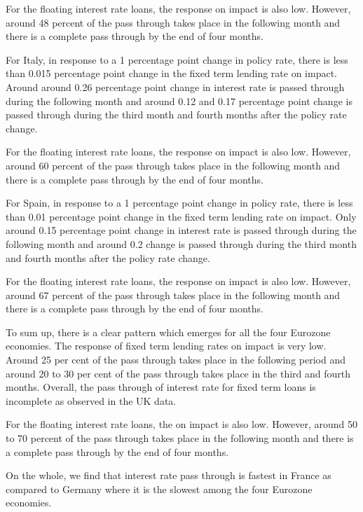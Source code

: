 \documentclass[12pt]{article}
\numberwithin{equation}{section}
\begin{document}
\begin{appendix}
For the floating interest rate loans, the response on impact is also low. However, around 48 percent of the pass through takes place in the following month and there is a complete pass through by the end of four months.


For Italy, in response to a 1 percentage point change in policy rate, there is less than 0.015 percentage point change in the fixed term lending rate on impact. Around around 0.26 percentage point change in interest rate is passed through during the following month and around 0.12 and 0.17 percentage point change is passed through during the third month and fourth months after the policy rate change.

For the floating interest rate loans, the response on impact is also low. However, around 60 percent of the pass through takes place in the following month and there is a complete pass through by the end of four months.


For Spain, in response to a 1 percentage point change in policy rate, there is less than 0.01 percentage point change in the fixed term lending rate on impact.  Only around 0.15 percentage point change in interest rate is passed through during the following month and around 0.2  change is passed through during the third month and fourth months after the policy rate change.

For the floating interest rate loans, the response on impact is also low. However, around 67 percent of the pass through takes place in the following month and there is a complete pass through by the end of four months.

To sum up, there is a clear pattern which emerges for all the four Eurozone economies. The response of fixed term lending rates on impact is very low. Around 25 per cent of the pass through takes place in the following period and around 20 to 30 per cent of the pass through takes place in the third and fourth months. Overall, the pass through of interest rate for fixed term loans is incomplete as observed in the UK data.

For the floating interest rate loans, the on impact is also low. However, around 50 to 70 percent of the pass through takes place in the following month and there is a complete pass through by the end of four months.

On the whole, we find that interest rate pass through is fastest in France as compared to Germany where it is the slowest among the four Eurozone economies.


\newpage



\end{appendix}
\end{document}
